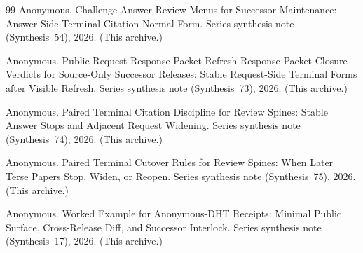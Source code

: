 \documentclass[11pt]{article}
\begin{document}
\begin{thebibliography}{99}
Anonymous.
\newblock Challenge Answer Review Menus for Successor Maintenance: Answer-Side Terminal Citation Normal Form.
\newblock Series synthesis note (Synthesis~54), 2026. (This archive.)

Anonymous.
\newblock Public Request Response Packet Refresh Response Packet Closure Verdicts for Source-Only Successor Releases: Stable Request-Side Terminal Forms after Visible Refresh.
\newblock Series synthesis note (Synthesis~73), 2026. (This archive.)

Anonymous.
\newblock Paired Terminal Citation Discipline for Review Spines: Stable Answer Stops and Adjacent Request Widening.
\newblock Series synthesis note (Synthesis~74), 2026. (This archive.)

Anonymous.
\newblock Paired Terminal Cutover Rules for Review Spines: When Later Terse Papers Stop, Widen, or Reopen.
\newblock Series synthesis note (Synthesis~75), 2026. (This archive.)

Anonymous.
\newblock Worked Example for Anonymous-DHT Receipts: Minimal Public Surface, Cross-Release Diff, and Successor Interlock.
\newblock Series synthesis note (Synthesis~17), 2026. (This archive.)

\end{thebibliography}
\end{document}
